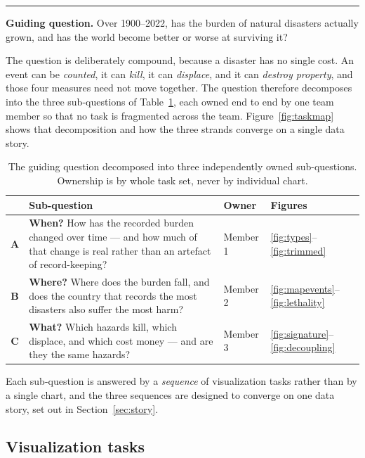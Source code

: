 \documentclass[11pt,a4paper]{article}
\newcommand{\callout}[1]{%
  \begin{center}\vspace{0.2em}
  \colorbox{bandgrey}{%
    \begin{minipage}{0.955\linewidth}
      \vspace{0.6em}
      {\color{inkblue}\rule{2.5pt}{1em}}\hspace{0.6em}%
      \begin{minipage}{0.93\linewidth}#1\end{minipage}
      \vspace{0.6em}
    \end{minipage}}
  \vspace{0.2em}\end{center}}
\begin{document}
\callout{\textbf{Guiding question.} Over 1900--2022, has the burden of natural
disasters actually grown, and has the world become better or worse at surviving
it?}

The question is deliberately compound, because a disaster has no single cost. An
event can be \emph{counted}, it can \emph{kill}, it can \emph{displace}, and it
can \emph{destroy property}, and those four measures need not move together. The
question therefore decomposes into the three sub-questions of
Table~\ref{tab:subq}, each owned end to end by one team member so that no task is
fragmented across the team. Figure~\ref{fig:taskmap} shows that decomposition and
how the three strands converge on a single data story.

\begin{table}[H]
\centering
\caption{The guiding question decomposed into three independently owned
sub-questions. Ownership is by whole task set, never by individual chart.}
\label{tab:subq}
\small
\begin{tabularx}{\linewidth}{@{}c X >{\raggedright\arraybackslash}p{1.9cm}
                               >{\raggedright\arraybackslash}p{2.0cm}@{}}
\toprule
& \textbf{Sub-question} & \textbf{Owner} & \textbf{Figures}\\
\midrule
\textbf{A} & \textbf{When?} How has the recorded burden changed over time --- and
how much of that change is real rather than an artefact of record-keeping?
& Member 1 & \ref{fig:types}--\ref{fig:trimmed}\\
\textbf{B} & \textbf{Where?} Where does the burden fall, and does the country that
records the most disasters also suffer the most harm?
& Member 2 & \ref{fig:mapevents}--\ref{fig:lethality}\\
\textbf{C} & \textbf{What?} Which hazards kill, which displace, and which cost
money --- and are they the same hazards?
& Member 3 & \ref{fig:signature}--\ref{fig:decoupling}\\
\bottomrule
\end{tabularx}
\end{table}

Each sub-question is answered by a \emph{sequence} of visualization tasks rather
than by a single chart, and the three sequences are designed to converge on one
data story, set out in Section~\ref{sec:story}.

\subsection{Visualization tasks}
\end{document}

